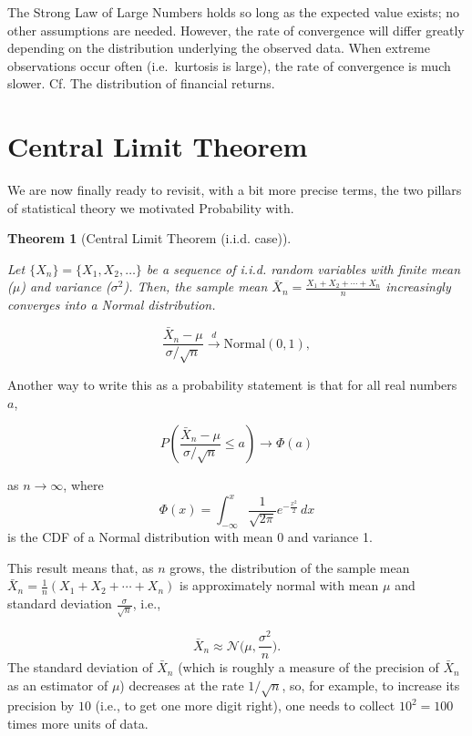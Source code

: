 \documentclass[
  letterpaper,
]{book}
\theoremstyle{definition}
\theoremstyle{definition}
\theoremstyle{plain}
\theoremstyle{definition}
\theoremstyle{plain}
\newtheorem{theorem}{Theorem}[chapter]
\theoremstyle{plain}
\theoremstyle{remark}
\begin{document}
The Strong Law of Large Numbers holds so long as the expected value
exists; no other assumptions are needed. However, the rate of
convergence will differ greatly depending on the distribution underlying
the observed data. When extreme observations occur often (i.e.~kurtosis
is large), the rate of convergence is much slower. Cf. The distribution
of financial returns.

\hypertarget{central-limit-theorem}{%
\section{Central Limit Theorem}\label{central-limit-theorem}}

We are now finally ready to revisit, with a bit more precise terms, the
two pillars of statistical theory we motivated Probability with.

\leavevmode{}%
\begin{theorem}[Central Limit Theorem (i.i.d. case)]\label{thm-clt}

Let \(\{X_n\} = \{X_1, X_2, \ldots\}\) be a sequence of i.i.d. random
variables with finite mean (\(\mu\)) and variance (\(\sigma^2\)). Then,
the sample mean \(\bar{X}_n = \frac{X_1 + X_2 + \cdots + X_n}{n}\)
increasingly converges into a Normal distribution.

\[\frac{\bar{X}_n - \mu}{\sigma / \sqrt{n}} \xrightarrow{d} \text{Normal}(0, 1),\]

\end{theorem}

Another way to write this as a probability statement is that for all
real numbers \(a\),

\[P\left(\frac{\bar{X}_n - \mu}{\sigma/\sqrt{n}} \le a\right) \rightarrow \Phi(a)\]

as \(n\to \infty\), where
\[\Phi(x) = \int_{-\infty}^x \frac{1}{\sqrt{2\pi}}e^{-\frac{x^2}{2}} \, dx\]
is the CDF of a Normal distribution with mean 0 and variance 1.

This result means that, as \(n\) grows, the distribution of the sample
mean \(\bar X_n = \frac{1}{n} (X_1 + X_2 + \cdots + X_n)\) is
approximately normal with mean \(\mu\) and standard deviation
\(\frac{\sigma}{\sqrt n}\), i.e.,

\[\bar{X}_n \approx \mathcal{N}\bigg(\mu, \frac{\sigma^2}{n}\bigg).\]
The standard deviation of \(\bar X_n\) (which is roughly a measure of
the precision of \(\bar X_n\) as an estimator of \(\mu\)) decreases at
the rate \(1/\sqrt{n}\), so, for example, to increase its precision by
\(10\) (i.e., to get one more digit right), one needs to collect
\(10^2=100\) times more units of data.
\end{document}
